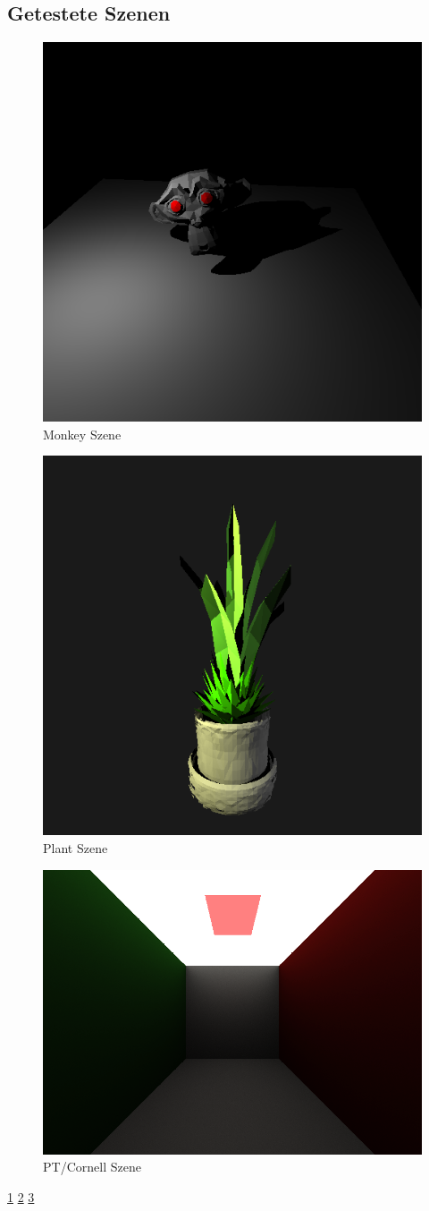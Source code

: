 \subsection{Getestete Szenen}
\begin{figure}
  \center
  \includegraphics[width=.6\textwidth]{images/monkey.png}
  \caption{Monkey Szene}
  \label{fig:monkey}
\end{figure}
\begin{figure}
  \center
  \includegraphics[width=.6\textwidth]{images/plant.png}
  \caption{Plant Szene}
  \label{fig:plant}
\end{figure}
\begin{figure}
  \center
  \includegraphics[width=.6\textwidth]{images/pt_cornell.png}
  \caption{PT/Cornell Szene}
  \label{fig:pt_cornell}
\end{figure}
\ref{fig:monkey}
\ref{fig:plant}
\ref{fig:pt_cornell}
  
